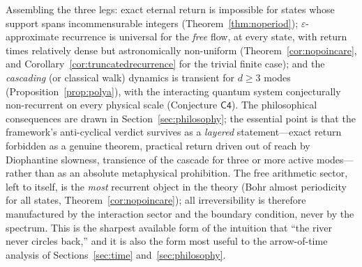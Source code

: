 Assembling the three legs: exact eternal return is impossible for states whose support spans
incommensurable integers (Theorem~\ref{thm:noperiod}); $\varepsilon$-approximate recurrence is
universal for the \emph{free} flow, at every state, with return times relatively dense but
astronomically non-uniform (Theorem~\ref{cor:nopoincare}, and
Corollary~\ref{cor:truncatedrecurrence} for the trivial finite case); and the \emph{cascading}
(or classical walk) dynamics is transient for $d\geq3$ modes (Proposition~\ref{prop:polya}),
with the interacting quantum system conjecturally non-recurrent on every physical scale
(Conjecture $\mathsf{C4}$). The philosophical consequences
are drawn in Section~\ref{sec:philosophy}; the essential point is that the framework's
anti-cyclical verdict survives as a \emph{layered} statement---exact return forbidden as a
genuine theorem, practical return driven out of reach by Diophantine slowness, transience
of the cascade for three or more active modes---rather than as an absolute metaphysical
prohibition. The free arithmetic sector, left to itself, is the \emph{most} recurrent object
in the theory (Bohr almost periodicity for all states, Theorem~\ref{cor:nopoincare}); all
irreversibility is therefore manufactured by the interaction sector and the boundary
condition, never by the spectrum. This is the sharpest available form of the intuition
that ``the river never circles back,'' and it is also the form most useful to
the arrow-of-time analysis of Sections~\ref{sec:time} and~\ref{sec:philosophy}.
